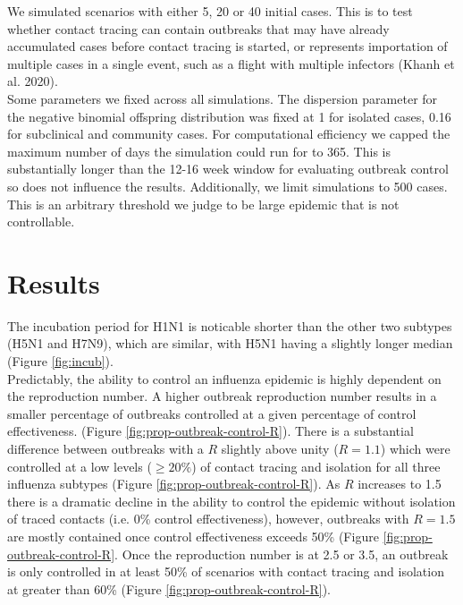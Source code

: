 \documentclass{article}
\begin{document}
\clearpage

We simulated scenarios with either 5, 20 or 40 initial cases. This is to test whether contact tracing can contain outbreaks that may have already accumulated cases before contact tracing is started, or represents importation of multiple cases in a single event, such as a flight with multiple infectors (Khanh et al. 2020). \\

Some parameters we fixed across all simulations. The dispersion parameter for the negative binomial offspring distribution was fixed at 1 for isolated cases, 0.16 for subclinical and community cases. For computational efficiency we capped the maximum number of days the simulation could run for to 365. This is substantially longer than the 12-16 week window for evaluating outbreak control so does not influence the results. Additionally, we limit simulations to 500 cases. This is an arbitrary threshold we judge to be large epidemic that is not controllable. \\

\section*{Results}

The incubation period for H1N1 is noticable shorter than the other two subtypes (H5N1 and H7N9), which are similar, with H5N1 having a slightly longer median (Figure \ref{fig:incub}). \\

Predictably, the ability to control an influenza epidemic is highly dependent on the reproduction number. A higher outbreak reproduction number results in a smaller percentage of outbreaks controlled at a given percentage of control effectiveness. (Figure \ref{fig:prop-outbreak-control-R}). There is a substantial difference between outbreaks with a $R$ slightly above unity ($R = 1.1$) which were controlled at a low levels ($\geq 20\%$) of contact tracing and isolation for all three influenza subtypes (Figure \ref{fig:prop-outbreak-control-R}). As $R$ increases to 1.5 there is a dramatic decline in the ability to control the epidemic without isolation of traced contacts (i.e. 0\% control effectiveness), however, outbreaks with $R = 1.5$ are mostly contained once control effectiveness exceeds 50\% (Figure \ref{fig:prop-outbreak-control-R}. Once the reproduction number is at 2.5 or 3.5, an outbreak is only controlled in at least 50\% of scenarios with contact tracing and isolation at greater than 60\% (Figure \ref{fig:prop-outbreak-control-R}). \\
\end{document}
